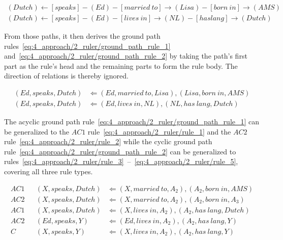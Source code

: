 \begin{align}
(Dutch)
    \leftarrow [speaks] - (Ed) - [married~to] \rightarrow (Lisa) - [born~in] \rightarrow (AMS)
    \label{eq:4_approach/2_ruler/path_1} \\

    (Dutch) \leftarrow [speaks] - (Ed) - [lives~in] \rightarrow (NL) - [has lang] \rightarrow (Dutch)
    \label{eq:4_approach/2_ruler/path_2}
\end{align}

From those paths, it then derives the ground path rules~\ref{eq:4_approach/2_ruler/ground_path_rule_1} and~\ref{eq:4_approach/2_ruler/ground_path_rule_2} by taking the path's first part as the rule's head and the remaining parts to form the rule body. The direction of relations is thereby ignored.

\begin{align}
(Ed, speaks, Dutch)
    &\Leftarrow (Ed, married~to, Lisa), (Lisa, born~in, AMS)
    \label{eq:4_approach/2_ruler/ground_path_rule_1} \\

    (Ed, speaks, Dutch) &\Leftarrow (Ed, lives~in, NL), (NL, has~lang, Dutch)
    \label{eq:4_approach/2_ruler/ground_path_rule_2}
\end{align}

The acyclic ground path rule~\ref{eq:4_approach/2_ruler/ground_path_rule_1} can be generalized to the $AC1$ rule~\ref{eq:4_approach/2_ruler/rule_1} and the $AC2$ rule~\ref{eq:4_approach/2_ruler/rule_2} while the cyclic ground path rule~\ref{eq:4_approach/2_ruler/ground_path_rule_2} can be generalized to rules~\ref{eq:4_approach/2_ruler/rule_3}~--~\ref{eq:4_approach/2_ruler/rule_5}, covering all three rule types.

\begin{align}
    AC1 && (X, speaks, Dutch) &\Leftarrow (X, married~to, A_2), (A_2, born~in, AMS)
    \label{eq:4_approach/2_ruler/rule_1} \\

    AC2 && (X, speaks, Dutch) &\Leftarrow (X, married~to, A_2), (A_2, born~in, A_3)
    \label{eq:4_approach/2_ruler/rule_2} \\

    AC1 && (X, speaks, Dutch) &\Leftarrow (X, lives~in, A_2), (A_2, has~lang, Dutch)
    \label{eq:4_approach/2_ruler/rule_3} \\

    AC2 && (Ed, speaks, Y) &\Leftarrow (Ed, lives~in, A_2), (A_2, has~lang, Y)
    \label{eq:4_approach/2_ruler/rule_4} \\

    C   && (X, speaks, Y) &\Leftarrow (X, lives~in, A_2), (A_2, has~lang, Y)
    \label{eq:4_approach/2_ruler/rule_5}
\end{align}

